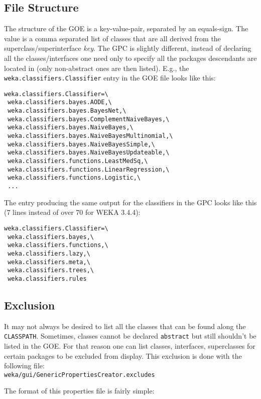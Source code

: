 \subsection{File Structure}
The structure of the GOE is a key-value-pair, separated by an
equals-sign. The value is a comma separated list of classes that are
all derived from the superclass/superinterface \textit{key}. The GPC is
slightly different, instead of declaring all the classes/interfaces
one need only to specify all the packages descendants are located in
(only non-abstract ones are then listed). E.g., the
\verb=weka.classifiers.Classifier= entry in the GOE file looks like this:
\begin{verbatim}
weka.classifiers.Classifier=\
 weka.classifiers.bayes.AODE,\
 weka.classifiers.bayes.BayesNet,\
 weka.classifiers.bayes.ComplementNaiveBayes,\
 weka.classifiers.bayes.NaiveBayes,\
 weka.classifiers.bayes.NaiveBayesMultinomial,\
 weka.classifiers.bayes.NaiveBayesSimple,\
 weka.classifiers.bayes.NaiveBayesUpdateable,\
 weka.classifiers.functions.LeastMedSq,\
 weka.classifiers.functions.LinearRegression,\
 weka.classifiers.functions.Logistic,\
 ...
\end{verbatim}
The entry producing the same output for the classifiers in the GPC
looks like this (7 lines instead of over 70 for WEKA 3.4.4):
\begin{verbatim}
weka.classifiers.Classifier=\
 weka.classifiers.bayes,\
 weka.classifiers.functions,\
 weka.classifiers.lazy,\
 weka.classifiers.meta,\
 weka.classifiers.trees,\
 weka.classifiers.rules
\end{verbatim}

\newpage

\subsection{Exclusion}
It may not always be desired to list all the classes that can be found
along the \verb=CLASSPATH=. Sometimes, classes cannot be declared \verb=abstract=
but still shouldn't be listed in the GOE. For that reason one can list
classes, interfaces, superclasses for certain packages to be excluded
from display. This exclusion is done with the following file:\\

{\small \verb=weka/gui/GenericPropertiesCreator.excludes=\\}

\noindent The format of this properties file is fairly simple:\\

